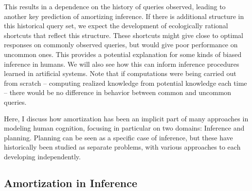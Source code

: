 This results in a dependence on the history of queries observed, leading to another key prediction of amortizing inference. If there is additional structure in this historical query set, we expect the development of ecologically rational shortcuts that reflect this structure. These shortcuts might give close to optimal responses on commonly observed queries, but would give poor performance on uncommon ones. This provides a potential explanation for some kinds of biased inference in humans. We will also see how this can inform inference procedures learned in artificial systems. Note that if computations were being carried out from scratch -- computing realized knowledge from potential knowledge each time -- there would be no difference in behavior between common and uncommon queries.

Here, I discuss how amortization has been an implicit part of many approaches in modeling human cognition, focusing in particular on two domains: Inference and planning. Planning can be seen as a specific case of inference\citep{botvinick2012planning}, but these have historically been studied as separate problems, with various approaches to each developing independently. %

\subsection{Amortization in Inference}


